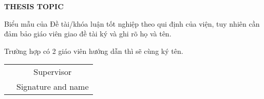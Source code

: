 \documentclass[../main.tex]{subfiles}
\begin{document}
\begin{center}
    \textbf{THESIS TOPIC}\\
\end{center}


Biểu mẫu của Đề tài/khóa luận tốt nghiệp theo qui định của viện, tuy nhiên cần đảm bảo giáo viên giao đề tài ký và ghi rõ họ và tên.

Trường hợp có 2 giáo viên hướng dẫn thì sẽ cùng ký tên. 

\vspace{15cm}


\begin{table}[H]
\centering
\begin{tabular}{p{5cm} c}
\multicolumn{1}{c}{\textbf{}} & Supervisor \\
\textbf{}                     & \small{Signature and name}
\end{tabular}
\end{table}
\end{document}

